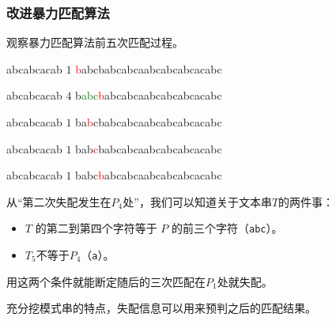 \documentclass{ctexbeamer}
\newcommand{\red}[1]{\textcolor{red}{#1}}
\newcommand{\green}[1]{\textcolor{green}{#1}}
\newcommand{\str}[1]{\texttt{#1}}
\begin{document}
\begin{frame}[fragile]
\frametitle{改进暴力匹配算法}

观察暴力匹配算法前五次匹配过程。

	\begin{tverb}[frame=bottomline, fontsize=\small]
abcabcacab \(1\)
\red{b}abcbabcabcaabcabcabcacabc
	\end{tverb}

\begin{tverb}[frame=bottomline, fontsize=\small]
 abcabcacab \(4\)
b\green{abc}\red{b}abcabcaabcabcabcacabc
	\end{tverb}


	\begin{tverb}[frame=bottomline, fontsize=\small]
  abcabcacab \(1\)
ba\red{b}cbabcabcaabcabcabcacabc
	\end{tverb}

	\begin{tverb}[frame=bottomline, fontsize=\small]
   abcabcacab \(1\)
bab\red{c}babcabcaabcabcabcacabc
	\end{tverb}

	\begin{tverb}[frame=bottomline, fontsize=\small]
    abcabcacab \(1\)
babc\red{b}abcabcaabcabcabcacabc
	\end{tverb}

从``第二次失配发生在$P_4$处''，我们可以知道关于文本串$T$的两件事：
\begin{itemize}
\item $T$ 的第二到第四个字符等于 $P$ 的前三个字符（\str{abc}）。
\item $T_5$不等于$P_4$（\str{a}）。
\end{itemize}
用这两个条件就能断定随后的三次匹配在$P_1$处就失配。

充分挖模式串的特点，失配信息可以用来预判之后的匹配结果。

\end{frame}
\end{document}

